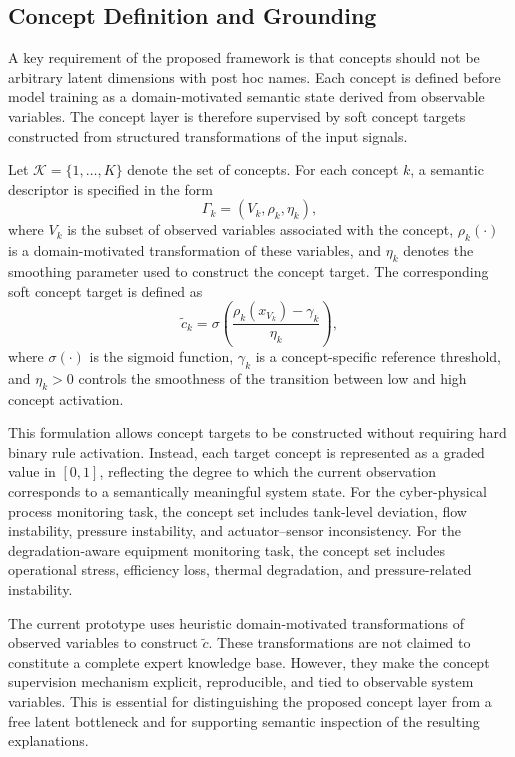 \documentclass[runningheads]{llncs}
\begin{document}
\subsection{Concept Definition and Grounding}

A key requirement of the proposed framework is that concepts should not be arbitrary latent dimensions with post hoc names. Each concept is defined before model training as a domain-motivated semantic state derived from observable variables. The concept layer is therefore supervised by soft concept targets constructed from structured transformations of the input signals.

Let $\mathcal{K}=\{1,\dots,K\}$ denote the set of concepts. For each concept $k$, a semantic descriptor is specified in the form
\begin{equation}
\Gamma_k = \left( V_k, \rho_k, \eta_k \right),
\end{equation}
where $V_k$ is the subset of observed variables associated with the concept, $\rho_k(\cdot)$ is a domain-motivated transformation of these variables, and $\eta_k$ denotes the smoothing parameter used to construct the concept target. The corresponding soft concept target is defined as
\begin{equation}
\tilde{c}_k =
\sigma\!\left(
\frac{\rho_k(x_{V_k})-\gamma_k}{\eta_k}
\right),
\end{equation}
where $\sigma(\cdot)$ is the sigmoid function, $\gamma_k$ is a concept-specific reference threshold, and $\eta_k>0$ controls the smoothness of the transition between low and high concept activation.

This formulation allows concept targets to be constructed without requiring hard binary rule activation. Instead, each target concept is represented as a graded value in $[0,1]$, reflecting the degree to which the current observation corresponds to a semantically meaningful system state. For the cyber-physical process monitoring task, the concept set includes tank-level deviation, flow instability, pressure instability, and actuator--sensor inconsistency. For the degradation-aware equipment monitoring task, the concept set includes operational stress, efficiency loss, thermal degradation, and pressure-related instability.

The current prototype uses heuristic domain-motivated transformations of observed variables to construct $\tilde{c}$. These transformations are not claimed to constitute a complete expert knowledge base. However, they make the concept supervision mechanism explicit, reproducible, and tied to observable system variables. This is essential for distinguishing the proposed concept layer from a free latent bottleneck and for supporting semantic inspection of the resulting explanations.
\end{document}

